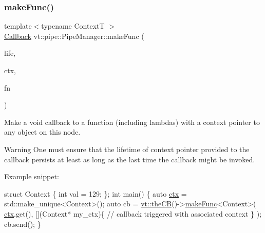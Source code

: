 \subsubsection{\texorpdfstring{make\+Func()}{makeFunc()}\hspace{0.1cm}{\footnotesize\ttfamily [4/6]}}
{\footnotesize\ttfamily template$<$typename ContextT $>$ \\
\hyperlink{namespacevt_a57b238783d05de96bc2c4027f7073b7f}{Callback} vt\+::pipe\+::\+Pipe\+Manager\+::make\+Func (\begin{DoxyParamCaption}\item[{\hyperlink{namespacevt_1_1pipe_acb42b284378c0fdac1d7c6335dc26f58}{Lifetime\+Enum}}]{life,  }\item[{ContextT $\ast$}]{ctx,  }\item[{\hyperlink{structvt_1_1pipe_1_1_pipe_manager_base_ad8463823b6b4cfdb67c119d6d22e3bac}{Func\+Ctx\+Type}$<$ ContextT $>$}]{fn }\end{DoxyParamCaption})}



Make a void callback to a function (including lambdas) with a context pointer to any object on this node. 

\begin{DoxyWarning}{Warning}
One must ensure that the lifetime of context pointer provided to the callback persists at least as long as the last time the callback might be invoked.
\end{DoxyWarning}
Example snippet\+:


\begin{DoxyCode}
\textcolor{keyword}{struct }Context \{ \textcolor{keywordtype}{int} val = 129; \};
\textcolor{keywordtype}{int} main() \{
  \textcolor{keyword}{auto} \hyperlink{namespacevt_1_1config_a0551245b6b893932b95aaf8eac94eed1}{ctx} = std::make\_unique<Context>();
  \textcolor{keyword}{auto} cb = \hyperlink{namespacevt_a673b109e94c7bca58313504c83e1da94}{vt::theCB}()->\hyperlink{structvt_1_1pipe_1_1_pipe_manager_a9ceec59c887d0fa1498b931c788962f6}{makeFunc}<Context>(
    \hyperlink{namespacevt_1_1config_a0551245b6b893932b95aaf8eac94eed1}{ctx}.get(), [](Context* my\_ctx)\{
      \textcolor{comment}{// callback triggered with associated context}
    \}
  );
  cb.send();
\}
\end{DoxyCode}



